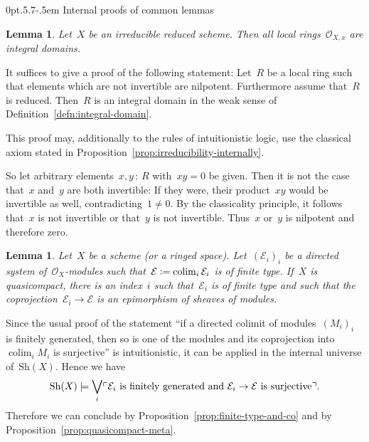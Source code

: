 \documentclass[10pt,reqno,a4paper]{amsbook}
\makeatletter
\theoremstyle{definition}
\theoremstyle{plain}
\newtheorem{lemma}[defn]{Lemma}
\theoremstyle{remark}
\newcommand{\E}{\mathcal{E}}
\renewcommand{\O}{\mathcal{O}}
\newcommand{\Sh}{\mathrm{Sh}}
\DeclareMathOperator*{\colim}{colim}
\newcommand{\?}{\,{:}\,}
\renewcommand{\_}{\mathpunct{.}\,}
\newcommand{\speak}[1]{\ulcorner\text{\textnormal{#1}}\urcorner}
\newcommand{\defeq}{\vcentcolon=}
\renewenvironment{proof}[1][\proofname]{\par
  \pushQED{\qed}%
  \normalfont \topsep6\p@\@plus6\p@\relax
  \trivlist
  \item[\hskip\labelsep
        \itshape
    #1\@addpunct{.}]\ignorespaces
}{%
  \popQED\endtrivlist\@endpefalse
}
\def\subsection{\@startsection{subsection}{2}%
  {0pt}{.5\linespacing\@plus.7\linespacing}{-.5em}%
  {\normalfont\bfseries}}
\makeatother
\begin{document}
\subsection{Internal proofs of common lemmas}

\begin{lemma}Let~$X$ be an irreducible reduced scheme. Then all local
rings~$\O_{X,x}$ are integral domains.\end{lemma}
\begin{proof}It suffices to give a proof of the following statement: Let~$R$ be
a local ring such that elements which are not invertible are nilpotent. Furthermore
assume that~$R$ is reduced. Then~$R$ is an integral domain in the weak sense of
Definition~\ref{defn:integral-domain}.

This proof may, additionally to the rules of intuitionistic logic, use the
classical axiom stated in Proposition~\ref{prop:irreducibility-internally}.

So let arbitrary elements~$x,y \? R$ with~$xy = 0$ be given. Then it is not the
case that~$x$ and~$y$ are both invertible: If they were, their product~$xy$
would be invertible as well, contradicting~$1 \neq 0$. By the classicality
principle, it follows that~$x$ is not invertible or that~$y$ is not invertible.
Thus~$x$ or~$y$ is nilpotent and therefore zero.
\end{proof}

\begin{lemma}Let~$X$ be a scheme (or a ringed space). Let~$(\E_i)_i$ be a
directed system of~$\O_X$-modules such that~$\E \defeq \colim_i \E_i$ is of
finite type. If~$X$ is quasicompact, there is an index~$i$ such that~$\E_i$ is
of finite type and such that the coprojection~$\E_i \to \E$ is an epimorphism
of sheaves of modules.
\end{lemma}

\begin{proof}Since the usual proof of the statement ``if a directed colimit of
modules~$(M_i)_i$ is finitely generated, then so is one of the modules and its
coprojection into~$\colim_i M_i$ is surjective'' is intuitionistic, it can be
applied in the internal universe of~$\Sh(X)$. Hence we have
\[ \Sh(X) \models \bigvee_i \speak{$\E_i$ is finitely generated and~$\E_i \to \E$
is surjective}. \]
Therefore we can conclude by Proposition~\ref{prop:finite-type-and-co} and
by Proposition~\ref{prop:quasicompact-meta}.
\end{proof}
\end{document}
